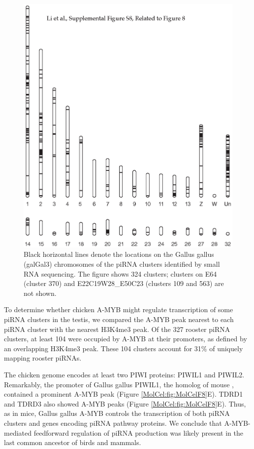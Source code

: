     \begin{figure} %
      \centering 
      \includegraphics{Figures/MolCel/MolCel2013_FigS8.eps}
      \caption[Genomic Locations of piRNA Clusters in the Rooster (Gallus gallus) Testis.]
      {
     	 Black horizontal lines denote the locations on the Gallus gallus (galGal3) chromosomes of the piRNA clusters identified by small RNA sequencing. The figure shows 324 clusters; clusters on E64 (cluster 370) and E22C19W28_E50C23 (clusters 109 and 563) are not shown.
     	 }
      \label{MolCel:fig:MolCelS8}
    	\end{figure}

    To determine whether chicken A-MYB might regulate transcription of some piRNA clusters in the testis, we compared the A-MYB peak nearest to each piRNA cluster with the nearest H3K4me3 peak. Of the 327 rooster piRNA clusters, at least 104 were occupied by A-MYB at their promoters, as defined by an overlapping H3K4me3 peak. These 104 clusters account for 31\% of uniquely mapping rooster piRNAs.

    The chicken genome encodes at least two PIWI proteins: PIWIL1 and PIWIL2. Remarkably, the promoter of Gallus gallus PIWIL1, the homolog of mouse \miwi{}, contained a prominent A-MYB peak (Figure \ref{MolCel:fig:MolCelF8}E). TDRD1 and TDRD3 also showed A-MYB peaks (Figure \ref{MolCel:fig:MolCelF8}E). Thus, as in mice, Gallus gallus A-MYB controls the transcription of both piRNA clusters and genes encoding piRNA pathway proteins. We conclude that A-MYB-mediated feedforward regulation of piRNA production was likely present in the last common ancestor of birds and mammals.

